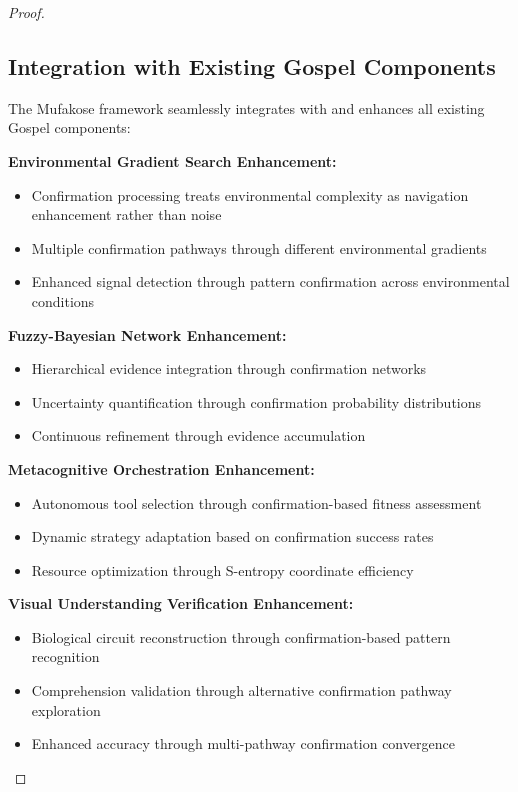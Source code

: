 \documentclass[12pt,a4paper]{article}
\begin{document}
\begin{proof}
\subsection{Integration with Existing Gospel Components}

The Mufakose framework seamlessly integrates with and enhances all existing Gospel components:

\textbf{Environmental Gradient Search Enhancement:}
\begin{itemize}
\item Confirmation processing treats environmental complexity as navigation enhancement rather than noise
\item Multiple confirmation pathways through different environmental gradients
\item Enhanced signal detection through pattern confirmation across environmental conditions
\end{itemize}

\textbf{Fuzzy-Bayesian Network Enhancement:}
\begin{itemize}
\item Hierarchical evidence integration through confirmation networks
\item Uncertainty quantification through confirmation probability distributions  
\item Continuous refinement through evidence accumulation
\end{itemize}

\textbf{Metacognitive Orchestration Enhancement:}
\begin{itemize}
\item Autonomous tool selection through confirmation-based fitness assessment
\item Dynamic strategy adaptation based on confirmation success rates
\item Resource optimization through S-entropy coordinate efficiency
\end{itemize}

\textbf{Visual Understanding Verification Enhancement:}
\begin{itemize}
\item Biological circuit reconstruction through confirmation-based pattern recognition
\item Comprehension validation through alternative confirmation pathway exploration
\item Enhanced accuracy through multi-pathway confirmation convergence
\end{itemize}


\end{proof}
\end{document}
